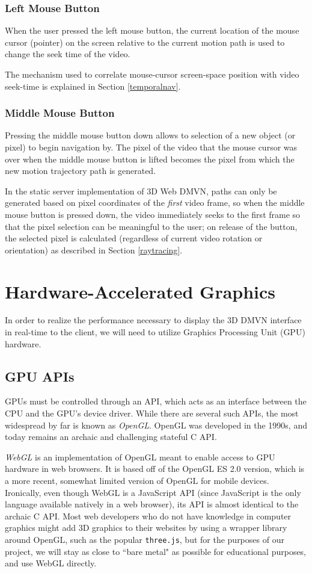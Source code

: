 \subsubsection{Left Mouse Button}
\label{uilmb}
When the user pressed the left mouse button, the current location of the mouse cursor (pointer) on the screen relative to the current motion path is used to change the seek time of the video.
\par The mechanism used to correlate mouse-cursor screen-space position with video seek-time is explained in Section \ref{temporalnav}.

\subsubsection{Middle Mouse Button}
\label{uimmb}
Pressing the middle mouse button down allows to selection of a new object (or pixel) to begin navigation by. The pixel of the video that the mouse cursor was over when the middle mouse button is lifted becomes the pixel from which the new motion trajectory path is generated.
\par In the static server implementation of 3D Web DMVN, paths can only be generated based on pixel coordinates of the \emph{first} video frame, so when the middle mouse button is pressed down, the video immediately seeks to the first frame so that the pixel selection can be meaningful to the user; on release of the button, the selected pixel is calculated (regardless of current video rotation or orientation) as described in Section \ref{raytracing}.


\section{Hardware-Accelerated Graphics}
In order to realize the performance necessary to display the 3D DMVN interface in real-time to the client, we will need to utilize Graphics Processing Unit (GPU) hardware.

\subsection{GPU APIs}
GPUs must be controlled through an API, which acts as an interface between the CPU and the GPU's device driver. While there are several such APIs, the most widespread by far is known as \emph{OpenGL}.\cite{opengl} OpenGL was developed in the 1990s, and today remains an archaic and challenging stateful C API.
\par \emph{WebGL} is an implementation of OpenGL meant to enable access to GPU hardware in web browsers. It is based off of the OpenGL ES 2.0 version\cite{opengles2}, which is a more recent, somewhat limited version of OpenGL for mobile devices. Ironically, even though WebGL is a JavaScript API (since JavaScript is the only language available natively in a web browser), its API is almost identical to the archaic C API. Most web developers who do not have knowledge in computer graphics might add 3D graphics to their websites by using a wrapper library around OpenGL, such as the popular \texttt{three.js}, but for the purposes of our project, we will stay as close to ``bare metal" as possible for educational purposes, and use WebGL directly.

